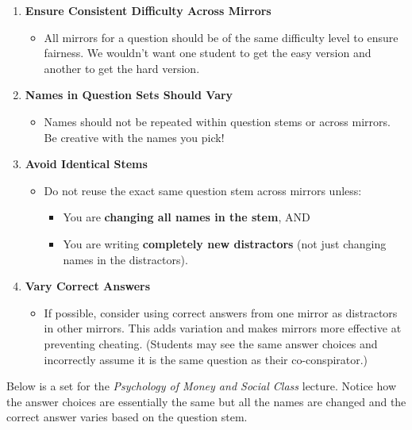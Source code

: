 \documentclass[
]{article}
\providecommand{\tightlist}{%
  \setlength{\itemsep}{0pt}\setlength{\parskip}{0pt}}
\begin{document}
\begin{enumerate}
\def\labelenumi{\arabic{enumi}.}
\tightlist
\item
  \textbf{Ensure Consistent Difficulty Across Mirrors}

  \begin{itemize}
  \tightlist
  \item
    All mirrors for a question should be of the same difficulty level to ensure fairness. We wouldn't want one student to get the easy version and another to get the hard version.
  \end{itemize}
\item
  \textbf{Names in Question Sets Should Vary}

  \begin{itemize}
  \tightlist
  \item
    Names should not be repeated within question stems or across mirrors. Be creative with the names you pick!
  \end{itemize}
\item
  \textbf{Avoid Identical Stems}

  \begin{itemize}
  \tightlist
  \item
    Do not reuse the exact same question stem across mirrors unless:

    \begin{itemize}
    \tightlist
    \item
      You are \textbf{changing all names in the stem}, AND\\
    \item
      You are writing \textbf{completely new distractors} (not just changing names in the distractors).
    \end{itemize}
  \end{itemize}
\item
  \textbf{Vary Correct Answers}

  \begin{itemize}
  \tightlist
  \item
    If possible, consider using correct answers from one mirror as distractors in other mirrors. This adds variation and makes mirrors more effective at preventing cheating. (Students may see the same answer choices and incorrectly assume it is the same question as their co-conspirator.)
  \end{itemize}
\end{enumerate}

Below is a set for the \emph{Psychology of Money and Social Class} lecture. Notice how the answer choices are essentially the same but all the names are changed and the correct answer varies based on the question stem.
\end{document}
